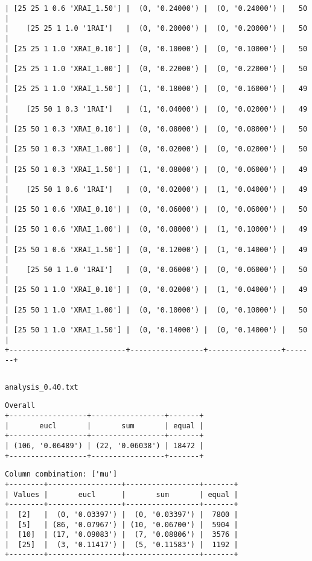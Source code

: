 \documentclass{article}
\begin{document}
\begin{verbatim}
| [25 25 1 0.6 'XRAI_1.50'] |  (0, '0.24000') |  (0, '0.24000') |   50  |
|    [25 25 1 1.0 '1RAI']   |  (0, '0.20000') |  (0, '0.20000') |   50  |
| [25 25 1 1.0 'XRAI_0.10'] |  (0, '0.10000') |  (0, '0.10000') |   50  |
| [25 25 1 1.0 'XRAI_1.00'] |  (0, '0.22000') |  (0, '0.22000') |   50  |
| [25 25 1 1.0 'XRAI_1.50'] |  (1, '0.18000') |  (0, '0.16000') |   49  |
|    [25 50 1 0.3 '1RAI']   |  (1, '0.04000') |  (0, '0.02000') |   49  |
| [25 50 1 0.3 'XRAI_0.10'] |  (0, '0.08000') |  (0, '0.08000') |   50  |
| [25 50 1 0.3 'XRAI_1.00'] |  (0, '0.02000') |  (0, '0.02000') |   50  |
| [25 50 1 0.3 'XRAI_1.50'] |  (1, '0.08000') |  (0, '0.06000') |   49  |
|    [25 50 1 0.6 '1RAI']   |  (0, '0.02000') |  (1, '0.04000') |   49  |
| [25 50 1 0.6 'XRAI_0.10'] |  (0, '0.06000') |  (0, '0.06000') |   50  |
| [25 50 1 0.6 'XRAI_1.00'] |  (0, '0.08000') |  (1, '0.10000') |   49  |
| [25 50 1 0.6 'XRAI_1.50'] |  (0, '0.12000') |  (1, '0.14000') |   49  |
|    [25 50 1 1.0 '1RAI']   |  (0, '0.06000') |  (0, '0.06000') |   50  |
| [25 50 1 1.0 'XRAI_0.10'] |  (0, '0.02000') |  (1, '0.04000') |   49  |
| [25 50 1 1.0 'XRAI_1.00'] |  (0, '0.10000') |  (0, '0.10000') |   50  |
| [25 50 1 1.0 'XRAI_1.50'] |  (0, '0.14000') |  (0, '0.14000') |   50  |
+---------------------------+-----------------+-----------------+-------+
\end{verbatim}

\begin{verbatim}

\end{verbatim}

\newpage
\verb|analysis_0.40.txt|
\begin{verbatim}
Overall
+------------------+-----------------+-------+
|       eucl       |       sum       | equal |
+------------------+-----------------+-------+
| (106, '0.06489') | (22, '0.06038') | 18472 |
+------------------+-----------------+-------+
\end{verbatim}

\begin{verbatim}
Column combination: ['mu']
+--------+-----------------+-----------------+-------+
| Values |       eucl      |       sum       | equal |
+--------+-----------------+-----------------+-------+
|  [2]   |  (0, '0.03397') |  (0, '0.03397') |  7800 |
|  [5]   | (86, '0.07967') | (10, '0.06700') |  5904 |
|  [10]  | (17, '0.09083') |  (7, '0.08806') |  3576 |
|  [25]  |  (3, '0.11417') |  (5, '0.11583') |  1192 |
+--------+-----------------+-----------------+-------+
\end{verbatim}
\end{document}
